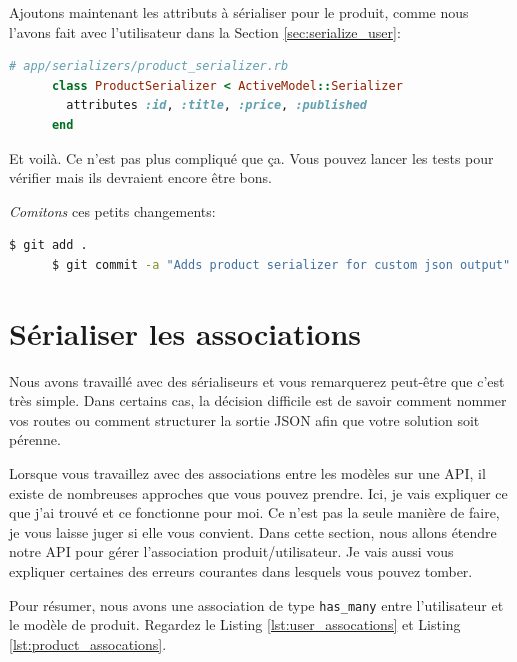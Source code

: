 \documentclass[]{report}
\begin{document}
    Ajoutons maintenant les attributs à sérialiser pour le produit, comme nous l'avons fait avec l'utilisateur dans la Section \ref{sec:serialize_user}:

    \begin{scriptsize}
      \begin{lstlisting}[language=ruby]
      # app/serializers/product_serializer.rb
      class ProductSerializer < ActiveModel::Serializer
        attributes :id, :title, :price, :published
      end
      \end{lstlisting}
    \end{scriptsize}

    Et voilà. Ce n'est pas plus compliqué que ça. Vous pouvez lancer les tests pour vérifier mais ils devraient encore être bons.

    \textit{Comitons} ces petits changements:

    \begin{scriptsize}
      \begin{lstlisting}[language=bash]
      $ git add .
      $ git commit -a "Adds product serializer for custom json output"
      \end{lstlisting}
    \end{scriptsize}

  \section{Sérialiser les associations}

    Nous avons travaillé avec des sérialiseurs et vous remarquerez peut-être que c'est très simple. Dans certains cas, la décision difficile est de savoir comment nommer vos routes ou comment structurer la sortie JSON afin que votre solution soit pérenne.

    Lorsque vous travaillez avec des associations entre les modèles sur une API, il existe de nombreuses approches que vous pouvez prendre. Ici, je vais expliquer ce que j'ai trouvé et ce fonctionne pour moi. Ce n'est pas la seule manière de faire, je vous laisse juger si elle vous convient. Dans cette section, nous allons étendre notre API pour gérer l'association produit/utilisateur. Je vais aussi vous expliquer certaines des erreurs courantes dans lesquels vous pouvez tomber.

    Pour résumer, nous avons une association de type \verb|has_many| entre l'utilisateur et le modèle de produit. Regardez le Listing \ref{lst:user_assocations} et Listing \ref{lst:product_assocations}.
\end{document}

